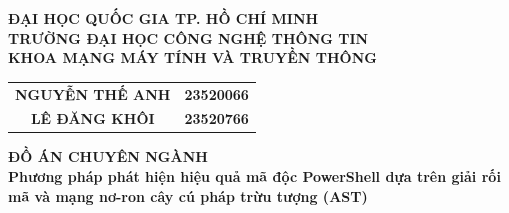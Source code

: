 \begin{titlepage}
    
    
    \begin{center}
        {\large\textbf{ ĐẠI HỌC QUỐC GIA TP. HỒ CHÍ MINH \\TRƯỜNG ĐẠI HỌC CÔNG NGHỆ THÔNG TIN \\ KHOA MẠNG MÁY TÍNH VÀ TRUYỀN THÔNG }\par}
    \end{center}
    
    \vspace*{40pt}

    \begingroup
    \setlength{\tabcolsep}{15pt}
    \begin{center}
    \large
        \begin{tabular}{cc}
            \textbf{NGUYỄN THẾ ANH}   & \textbf{23520066} \\
            \textbf{LÊ ĐĂNG KHÔI}      & \textbf{23520766}
        \end{tabular}
    \end{center}
    \endgroup

    \vspace*{40pt}
    
    \begin{center}
        \Large\textbf{ĐỒ ÁN CHUYÊN NGÀNH} \\
        \vspace*{5pt}
        \Large\textbf{Phương pháp phát hiện hiệu quả mã độc PowerShell dựa trên giải rối mã và mạng nơ-ron cây cú pháp trừu tượng (AST)} \\
        \vspace*{5pt}
        \large\textbf{\color{red}{A deobfuscation and AST neural network enabled effective detection method for malicious PowerShell Scripts}}
    \end{center}


\end{titlepage}
